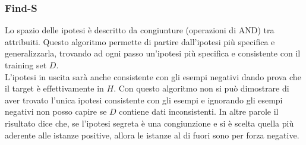 \subsubsection{Find-S}
Lo spazio delle ipotesi è descritto da congiunture (operazioni di AND) tra attribuiti. 
Questo algoritmo permette di partire dall'ipotesi più specifica  e generalizzarla, trovando ad ogni passo un'ipotesi più specifica e consistente con il training set $D$. \\
L'ipotesi in uscita sarà anche consistente con gli esempi negativi dando prova che il target è effettivamente in $H$. Con questo algoritmo non si può dimostrare di aver trovato l'unica ipotesi consistente con gli esempi e ignorando gli esempi negativi non posso capire se $D$ contiene dati inconsistenti. In altre parole il risultato dice che, se l’ipotesi segreta è una congiunzione e si è scelta quella più aderente alle istanze positive, allora le istanze al di fuori sono per forza negative.